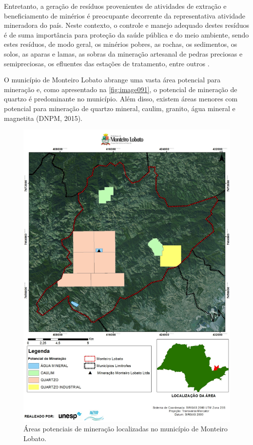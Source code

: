 Entretanto, a geração de resíduos provenientes de atividades de extração e beneficiamento de minérios é preocupante decorrente da representativa atividade mineradora do país. Neste contexto, o controle e manejo adequado destes resíduos é de suma importância para proteção da saúde pública e do meio ambiente, sendo estes resíduos, de modo geral, os minérios pobres, as rochas, os sedimentos, os solos, as aparas e lamas, as sobras da mineração artesanal de pedras preciosas e semipreciosas, os efluentes das estações de tratamento, entre outros \cite{IBRAM2016}. 

O município de Monteiro Lobato abrange uma vasta área potencial para mineração e, como apresentado na \autoref{fig:image091}, o potencial de mineração de quartzo é predominante no município. Além disso, existem áreas menores com potencial para mineração de quartzo mineral, caulim, granito, água mineral e magnetita (DNPM, 2015).

\begin{figure}
	\centering
	\includegraphics[width=1\linewidth]{produtos/prodtres/image091}
	\caption{Áreas potenciais de mineração localizadas no município de Monteiro Lobato.}
	\label{fig:image091}
\end{figure}


